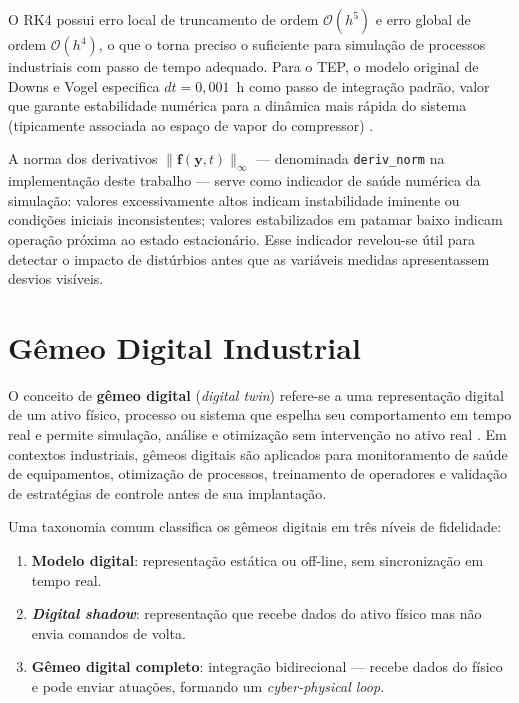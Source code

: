 O RK4 possui erro local de truncamento de ordem $\mathcal{O}(h^5)$ e erro global de ordem $\mathcal{O}(h^4)$, o que o torna preciso o suficiente para simulação de processos industriais com passo de tempo adequado. Para o TEP, o modelo original de Downs e Vogel especifica $dt = 0{,}001$~h como passo de integração padrão, valor que garante estabilidade numérica para a dinâmica mais rápida do sistema (tipicamente associada ao espaço de vapor do compressor) \cite{DOWNS1993}.

A norma dos derivativos $\|\mathbf{f}(\mathbf{y}, t)\|_\infty$ — denominada \texttt{deriv\_norm} na implementação deste trabalho — serve como indicador de saúde numérica da simulação: valores excessivamente altos indicam instabilidade iminente ou condições iniciais inconsistentes; valores estabilizados em patamar baixo indicam operação próxima ao estado estacionário. Esse indicador revelou-se útil para detectar o impacto de distúrbios antes que as variáveis medidas apresentassem desvios visíveis.

\section{Gêmeo Digital Industrial}
\label{sec:twin}

O conceito de \textbf{gêmeo digital} (\textit{digital twin}) refere-se a uma representação digital de um ativo físico, processo ou sistema que espelha seu comportamento em tempo real e permite simulação, análise e otimização sem intervenção no ativo real \cite{DURAIVELU20221825}. Em contextos industriais, gêmeos digitais são aplicados para monitoramento de saúde de equipamentos, otimização de processos, treinamento de operadores e validação de estratégias de controle antes de sua implantação.

Uma taxonomia comum classifica os gêmeos digitais em três níveis de fidelidade:
\begin{enumerate}
  \item \textbf{Modelo digital}: representação estática ou off-line, sem sincronização em tempo real.
  \item \textbf{\textit{Digital shadow}}: representação que recebe dados do ativo físico mas não envia comandos de volta.
  \item \textbf{Gêmeo digital completo}: integração bidirecional — recebe dados do físico e pode enviar atuações, formando um \textit{cyber-physical loop}.
\end{enumerate}

